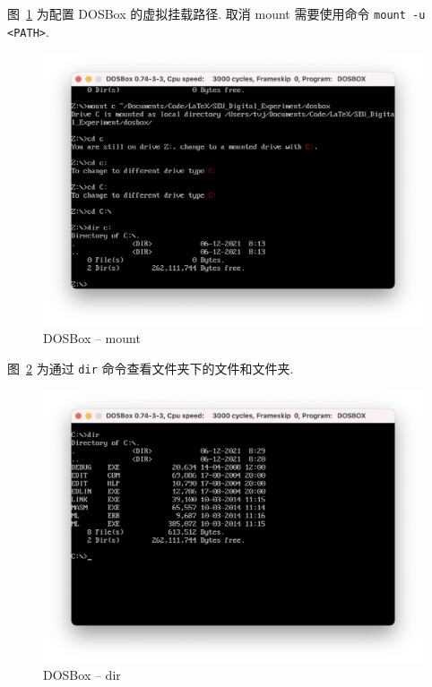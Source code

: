 \documentclass[11pt]{SEU-Digital-Report}
\begin{document}
      \newpage

      图~\ref{fig:dos_mount} 为配置 DOSBox 的虚拟挂载路径.
      取消 mount 需要使用命令 \texttt{mount -u <PATH>}.
      \begin{figure}[h!]
        \centering
        \includegraphics[width=.8\linewidth]{fig/dosbox/mount.png}
        \vspace{-5mm}
        \caption{DOSBox -- mount}
        \label{fig:dos_mount}
      \end{figure}


      图~\ref{fig:dos_dir} 为通过 \texttt{dir} 命令查看文件夹下的文件和文件夹.
      \begin{figure}[h!]
        \centering
        \includegraphics[width=.8\linewidth]{fig/dosbox/dir.png}
        \vspace{-5mm}
        \caption{DOSBox -- dir}
        \label{fig:dos_dir}
      \end{figure}
      
      \newpage
\end{document}
